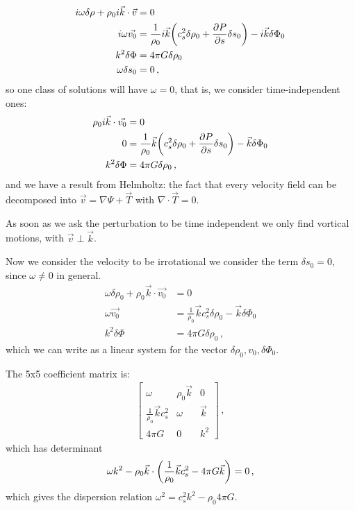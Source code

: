 \documentclass[main.tex]{subfiles}
\begin{document}
\begin{subequations}
\begin{align}
  i \omega \delta \rho + \rho_0 i \vec{k} \cdot \vec{v} &=0  \\
  i \omega \vec{v_0} &= \frac{1}{\rho_0 } i \vec{k}
  \qty(c^2_s \delta \rho_0 + \pdv{P}{s} \delta s_0 ) 
  - i \vec{k} \delta \Phi_0 \\
  k^2 \delta \Phi &= 4 \pi G \delta \rho_0  \\
  \omega \delta s_0 &= 0
\,,
\end{align}
\end{subequations}
%
so one class of solutions will have \(\omega = 0\), that is, we consider time-independent ones: 
%
\begin{subequations}
\begin{align}
  \rho_0 i \vec{k} \cdot \vec{v_0} &=0  \\
  0 &= \frac{1}{\rho_0 }  \vec{k}
  \qty(c^2_s \delta \rho_0 + \pdv{P}{s} \delta s_0 ) 
  - \vec{k} \delta \Phi_0 \\
  k^2 \delta \Phi &= 4 \pi G \delta \rho_0  
\,,
\end{align}
\end{subequations}
%
and we have a result from Helmholtz: the fact that every velocity field can be decomposed into \(\vec{v} = \nabla \Psi + \vec{T}\) with \(\nabla \cdot \vec{T} = 0\). 

As soon as we ask the perturbation to be time independent we only find vortical motions, with \(\vec{v} \perp \vec{k}\). 

Now we consider the velocity to be irrotational we consider the term \(\delta s_0 =0\), since \(\omega \neq 0\) in general. 
%
\begin{subequations}
\begin{align}
  \omega \delta \rho_0 + \rho_0 \vec{k} \cdot \vec{v_0} &=0  \\
  \omega \vec{v_0} &= \frac{1}{\rho_0 } \vec{k}
  c^2_s \delta \rho_0  
  - \vec{k} \delta \Phi_0 \\
  k^2 \delta \Phi &= 4 \pi G \delta \rho_0 
\,,
\end{align}
\end{subequations}
%
which we can write as a linear system for the vector \(\delta \rho_0 , v_0, \delta \Phi_0 \). 

The 5x5 coefficient matrix is:
%
\begin{subequations}
\begin{align}
  \left[\begin{array}{ccc}
  \omega  & \rho_0 \vec{k}  & 0 \\ 
  \frac{1}{\rho_0 } \vec{k} c_s^2 & \omega  & \vec{k} \\ 
  4 \pi G & 0 & k^2
  \end{array}\right]
  \,,
\end{align}
\end{subequations}
%
which has determinant 
%
\begin{align}
  \omega k^2 - \rho_0 \vec{k} \cdot \qty( \frac{1}{\rho_0 }\vec{k} c_s^2 - 4 \pi G \vec{k} ) = 0
\,,
\end{align}
%
which gives the dispersion relation \(\omega^2 = c_s^2 k^2 - \rho_0 4 \pi G \). 
\end{document}
